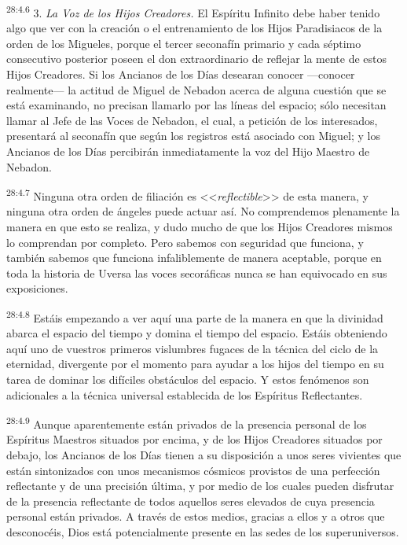 \par
\textsuperscript{28:4.6} 3. \textit{La Voz de los Hijos Creadores.} El Espíritu Infinito debe haber tenido algo que ver con la creación o el entrenamiento de los Hijos Paradisiacos de la orden de los Migueles, porque el tercer seconafín primario y cada séptimo consecutivo posterior poseen el don extraordinario de reflejar la mente de estos Hijos Creadores. Si los Ancianos de los Días desearan conocer ---conocer realmente--- la actitud de Miguel de Nebadon acerca de alguna cuestión que se está examinando, no precisan llamarlo por las líneas del espacio; sólo necesitan llamar al Jefe de las Voces de Nebadon, el cual, a petición de los interesados, presentará al seconafín que según los registros está asociado con Miguel; y los Ancianos de los Días percibirán inmediatamente la voz del Hijo Maestro de Nebadon.

\par
\textsuperscript{28:4.7} Ninguna otra orden de filiación es <<\textit{reflectible}>> de esta manera, y ninguna otra orden de ángeles puede actuar así. No comprendemos plenamente la manera en que esto se realiza, y dudo mucho de que los Hijos Creadores mismos lo comprendan por completo. Pero sabemos con seguridad que funciona, y también sabemos que funciona infaliblemente de manera aceptable, porque en toda la historia de Uversa las voces secoráficas nunca se han equivocado en sus exposiciones.

\par
\textsuperscript{28:4.8} Estáis empezando a ver aquí una parte de la manera en que la divinidad abarca el espacio del tiempo y domina el tiempo del espacio. Estáis obteniendo aquí uno de vuestros primeros vislumbres fugaces de la técnica del ciclo de la eternidad, divergente por el momento para ayudar a los hijos del tiempo en su tarea de dominar los difíciles obstáculos del espacio. Y estos fenómenos son adicionales a la técnica universal establecida de los Espíritus Reflectantes.

\par
\textsuperscript{28:4.9} Aunque aparentemente están privados de la presencia personal de los Espíritus Maestros situados por encima, y de los Hijos Creadores situados por debajo, los Ancianos de los Días tienen a su disposición a unos seres vivientes que están sintonizados con unos mecanismos cósmicos provistos de una perfección reflectante y de una precisión última, y por medio de los cuales pueden disfrutar de la presencia reflectante de todos aquellos seres elevados de cuya presencia personal están privados. A través de estos medios, gracias a ellos y a otros que desconocéis, Dios está potencialmente presente en las sedes de los superuniversos.

